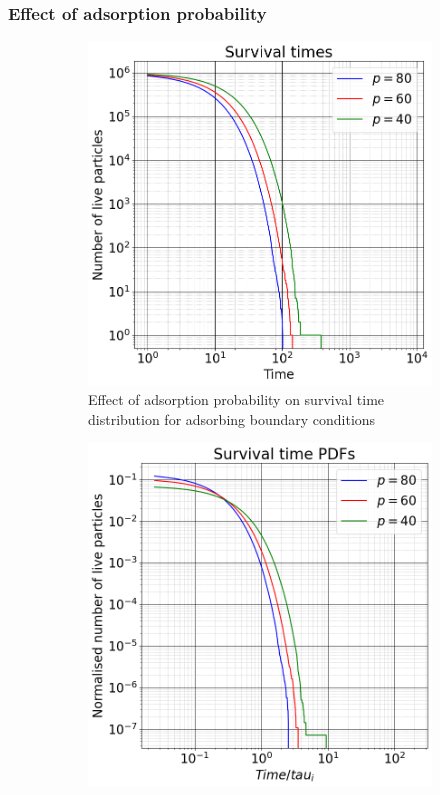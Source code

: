 \documentclass{article}
\begin{document}
\subsubsection{Effect of adsorption probability}
\begin{figure}[htbp]
    \centering
    \begin{subfigure}[b]{0.45\textwidth}
        \centering
        \includegraphics[width=\textwidth]{images/survTimeDistCompareProb.png}
        \caption{Effect of adsorption probability on survival time distribution for adsorbing boundary conditions}
    \end{subfigure}
    \hfill
    \begin{subfigure}[b]{0.45\textwidth}
        \centering
        \includegraphics[width=\textwidth]{images/survTimeDistCompareProbNorm.png}

\end{subfigure}
\end{figure}
\end{document}
